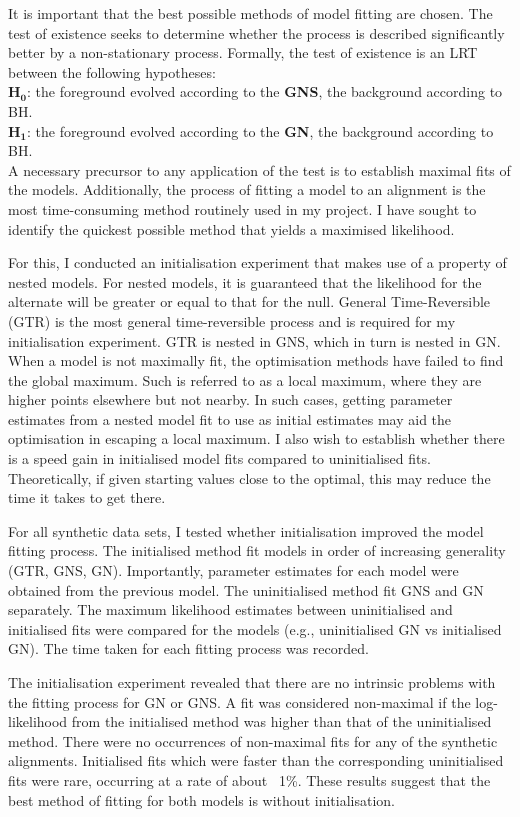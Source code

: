 It is important that the best possible methods of model fitting are chosen. The test of existence seeks to determine whether the process is described significantly better by a non-stationary process. Formally, the test of existence is an LRT between the following hypotheses:\\ $\mathbf{H_0}$: the foreground evolved according to the \textbf{GNS}, the background according to BH. \\ $\mathbf{H_1}$: the foreground evolved according to the \textbf{GN}, the background according to BH.\\
A necessary precursor to any application of the test is to establish maximal fits of the models. Additionally, the process of fitting a model to an alignment is the most time-consuming method routinely used in my project. I have sought to identify the quickest possible method that yields a maximised likelihood. 

For this, I conducted an initialisation experiment that makes use of a property of nested models. For nested models, it is guaranteed that the likelihood for the alternate will be greater or equal to that for the null. General Time-Reversible (GTR) is the most general time-reversible process and is required for my initialisation experiment. GTR is nested in GNS, which in turn is nested in GN. When a model is not maximally fit, the optimisation methods have failed to find the global maximum. Such is referred to as a local maximum, where they are higher points elsewhere but not nearby. In such cases, getting parameter estimates from a nested model fit to use as initial estimates may aid the optimisation in escaping a local maximum. I also wish to establish whether there is a speed gain in initialised model fits compared to uninitialised fits. Theoretically, if given starting values close to the optimal, this may reduce the time it takes to get there. 

For all synthetic data sets, I tested whether initialisation improved the model fitting process. The initialised method fit models in order of increasing generality (GTR, GNS, GN). Importantly, parameter estimates for each model were obtained from the previous model. The uninitialised method fit GNS and GN separately. The maximum likelihood estimates between uninitialised and initialised fits were compared for the models (e.g., uninitialised GN vs initialised GN). The time taken for each fitting process was recorded.  

The initialisation experiment revealed that there are no intrinsic problems with the fitting process for GN or GNS. A fit was considered non-maximal if the log-likelihood from the initialised method was higher than that of the uninitialised method. There were no occurrences of non-maximal fits for any of the synthetic alignments. Initialised fits which were faster than the corresponding uninitialised fits were rare, occurring at a rate of about ~1\%. These results suggest that the best method of fitting for both models is without initialisation.

